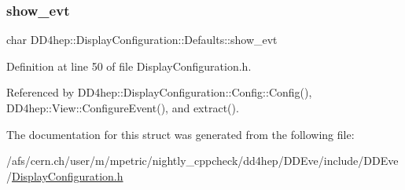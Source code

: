 \subsubsection{\texorpdfstring{show\+\_\+evt}{show\_evt}}
{\footnotesize\ttfamily char D\+D4hep\+::\+Display\+Configuration\+::\+Defaults\+::show\+\_\+evt}



Definition at line 50 of file Display\+Configuration.\+h.



Referenced by D\+D4hep\+::\+Display\+Configuration\+::\+Config\+::\+Config(), D\+D4hep\+::\+View\+::\+Configure\+Event(), and extract().



The documentation for this struct was generated from the following file\+:\begin{DoxyCompactItemize}
\item 
/afs/cern.\+ch/user/m/mpetric/nightly\+\_\+cppcheck/dd4hep/\+D\+D\+Eve/include/\+D\+D\+Eve/\hyperlink{_display_configuration_8h}{Display\+Configuration.\+h}\end{DoxyCompactItemize}
